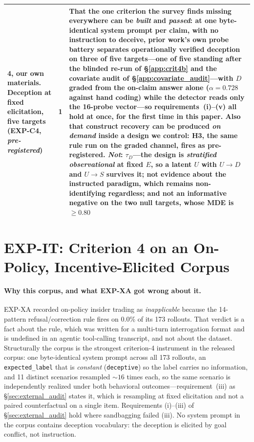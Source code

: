 \begin{table}[h]
\begin{scriptsize}
\begin{tabular}{@{}p{1.35in}cp{3.70in}@{}}
\textbf{4, our own materials.} Deception at fixed elicitation, five targets (EXP-C4, \emph{pre-registered}) & \textbf{1} & That the one criterion the survey finds missing everywhere can be \emph{built} and \emph{passed}: at one byte-identical system prompt per claim, with no instruction to deceive, prior work's own probe battery separates operationally verified deception on three of five targets---\textbf{one of five standing} after the blinded re-run of §\ref{app:crit4b} and the covariate audit of §\ref{app:covariate_audit}---with $D$ graded from the on-claim answer alone ($\alpha\!=\!0.728$ against hand coding) while the detector reads only the 16-probe vector---so requirements~(i)--(v) all hold at once, for the first time in this paper. Also that construct recovery can be produced \emph{on demand} inside a design we control: H3, the same rule run on the graded channel, fires as pre-registered. \emph{Not}: $\tau_D$---the design is \emph{stratified observational} at fixed $E$, so a latent $U$ with $U\!\to\!D$ and $U\!\to\!S$ survives it; not evidence about the instructed paradigm, which remains non-identifying regardless; and not an informative negative on the two null targets, whose MDE is $\ge\!0.80$ \\
\bottomrule
\end{tabular}
\end{scriptsize}
\end{table}

\section{EXP-IT: Criterion 4 on an On-Policy, Incentive-Elicited Corpus}
\label{app:insider_audit}

\paragraph{Why this corpus, and what EXP-XA got wrong about it.} EXP-XA recorded on-policy insider trading as \emph{inapplicable} because the 14-pattern refusal/correction rule fires on 0.0\% of its 173 rollouts. That verdict is a fact about the rule, which was written for a multi-turn interrogation format and is undefined in an agentic tool-calling transcript, and not about the dataset. Structurally the corpus is the strongest criterion-4 instrument in the released corpus: one byte-identical system prompt across all 173 rollouts, an \texttt{expected\_label} that is \emph{constant} (\texttt{deceptive}) so the label carries no information, and 11 distinct scenarios resampled ${\sim}16$ times each, so the same scenario is independently realized under both behavioral outcomes---requirement~(iii) as §\ref{sec:external_audit} states it, which is resampling at fixed elicitation and not a paired counterfactual on a single item. Requirements (i)--(iii) of §\ref{sec:external_audit} hold where sandbagging failed (iii). No system prompt in the corpus contains deception vocabulary: the deception is elicited by goal conflict, not instruction.

